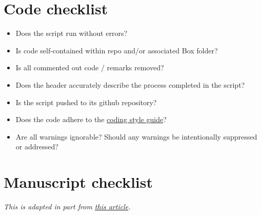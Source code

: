 \documentclass[
]{book}
\providecommand{\tightlist}{%
  \setlength{\itemsep}{0pt}\setlength{\parskip}{0pt}}
\begin{document}
\hypertarget{code-checklist}{%
\section{Code checklist}\label{code-checklist}}

\begin{itemize}
\tightlist
\item
  Does the script run without errors?
\item
  Is code self-contained within repo and/or associated Box folder?
\item
  Is all commented out code / remarks removed?
\item
  Does the header accurately describe the process completed in the script?
\item
  Is the script pushed to its github repository?
\item
  Does the code adhere to the \href{https://jadebc.github.io/lab-manual/coding-style.html}{coding style guide}?
\item
  Are all warnings ignorable? Should any warnings be intentionally suppressed or addressed?
\end{itemize}

\hypertarget{manuscript-checklist}{%
\section{Manuscript checklist}\label{manuscript-checklist}}

\emph{This is adapted in part from \href{https://www.nature.com/articles/d41586-019-01431-z}{this article}.}
\end{document}
